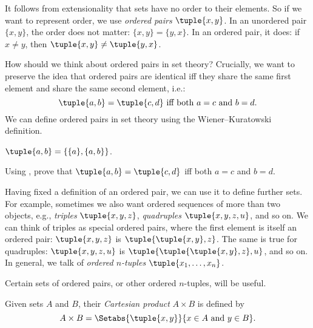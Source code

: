 \documentclass[../../../include/open-logic-section]{subfiles}
\begin{document}

\begin{explain}
It follows from extensionality that sets have no order to their
elements. So if we want to represent order, we use \emph{ordered
pairs} $\tuple{x, y}$. In an unordered pair $\{x, y\}$, the order does
not matter: $\{x, y\} = \{y, x\}$. In an ordered pair, it does: if $x
\neq y$, then $\tuple{x, y} \neq \tuple{y, x}$.

How should we think about ordered pairs in set theory? Crucially, we
want to preserve the idea that ordered pairs are identical iff they
share the same first element and share the same second element, i.e.:
\[
  \tuple{a, b}= \tuple{c, d}\text{ iff both }a = c \text{ and }b=d.
\]
We can define ordered pairs in set theory using the Wiener--Kuratowski
definition.
\end{explain}

\begin{defn}
	$\tuple{a, b} = \{\{a\}, \{a, b\}\}$.
\end{defn}

\begin{prob}
	Using , prove that $\tuple{a,
	b}= \tuple{c, d}$ iff both $a = c$ and $b=d$.
\end{prob}

\begin{explain}
Having fixed a definition of an ordered pair, we can use it to define
further sets. For example, sometimes we also want ordered sequences of
more than two objects, e.g., \emph{triples} $\tuple{x, y, z}$,
\emph{quadruples} $\tuple{x, y, z, u}$, and so on.  We can think of
triples as special ordered pairs, where the first element is itself an
ordered pair: $\tuple{x, y, z}$ is $\tuple{\tuple{x, y},z}$. The same
is true for quadruples: $\tuple{x,y,z,u}$ is
$\tuple{\tuple{\tuple{x,y},z},u}$, and so on. In general, we talk of
\emph{ordered $n$-tuples} $\tuple{x_1, \dots, x_n}$.

Certain sets of ordered pairs, or other ordered $n$-tuples, will be useful.
\end{explain}

\begin{defn}
Given sets $A$ and $B$, their \emph{Cartesian product} $A \times B$ is
defined by
\[
  A \times B = \Setabs{\tuple{x, y}}{x \in A \text{ and } y \in B}.
\]
\end{defn}
\end{document}
